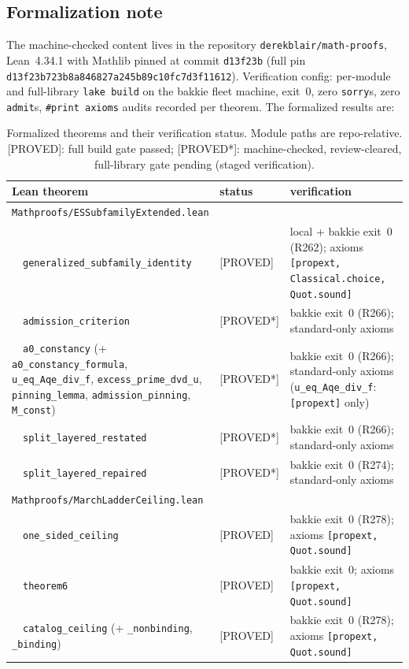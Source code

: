 \documentclass[11pt,a4paper]{article}
\theoremstyle{definition}
\begin{document}
\subsection{Formalization note}
\label{sec:formalization}

The machine-checked content lives in the repository
\texttt{derekblair/math-proofs}, Lean~4.34.1 with Mathlib pinned at
commit \texttt{d13f23b} (full pin
\texttt{d13f23b723b8a846827a245b89c10fc7d3f11612}).
Verification config: per-module and full-library \texttt{lake build} on
the bakkie fleet machine, exit~$0$, zero \texttt{sorry}s, zero
\texttt{admit}s, \texttt{\#print axioms} audits recorded per theorem.
The formalized results are:

\begin{table}[t]
  \centering
  \caption{Formalized theorems and their verification status. Module
    paths are repo-relative. [PROVED]: full build gate passed;
    [PROVED*]: machine-checked, review-cleared, full-library gate
    pending (staged verification).}
  \label{tab:formalization}
  \begin{tabular}{llp{5.2cm}}
    \toprule
    Lean theorem & status & verification \\
    \midrule
    \multicolumn{3}{l}{\texttt{Mathproofs/ESSubfamilyExtended.lean}} \\
    \ \ \texttt{generalized\_subfamily\_identity}
      & [PROVED]
      & local + bakkie exit~0 (R262); axioms
        \texttt{[propext, Classical.choice, Quot.sound]} \\
    \ \ \texttt{admission\_criterion}
      & [PROVED*]
      & bakkie exit~0 (R266); standard-only axioms \\
    \ \ \texttt{a0\_constancy} (+ \texttt{a0\_constancy\_formula},
        \texttt{u\_eq\_Aqe\_div\_f}, \texttt{excess\_prime\_dvd\_u},
        \texttt{pinning\_lemma}, \texttt{admission\_pinning},
        \texttt{M\_const})
      & [PROVED*]
      & bakkie exit~0 (R266); standard-only axioms
        (\texttt{u\_eq\_Aqe\_div\_f}: \texttt{[propext]} only) \\
    \ \ \texttt{split\_layered\_restated}
      & [PROVED*]
      & bakkie exit~0 (R266); standard-only axioms \\
    \ \ \texttt{split\_layered\_repaired}
      & [PROVED*]
      & bakkie exit~0 (R274); standard-only axioms \\
    \multicolumn{3}{l}{\texttt{Mathproofs/MarchLadderCeiling.lean}} \\
    \ \ \texttt{one\_sided\_ceiling}
      & [PROVED]
      & bakkie exit~0 (R278); axioms \texttt{[propext, Quot.sound]} \\
    \ \ \texttt{theorem6}
      & [PROVED]
      & bakkie exit~0; axioms \texttt{[propext, Quot.sound]} \\
    \ \ \texttt{catalog\_ceiling} (+ \texttt{\_nonbinding},
        \texttt{\_binding})
      & [PROVED]
      & bakkie exit~0 (R278); axioms \texttt{[propext, Quot.sound]} \\
    \bottomrule
  \end{tabular}
\end{table}
\end{document}
